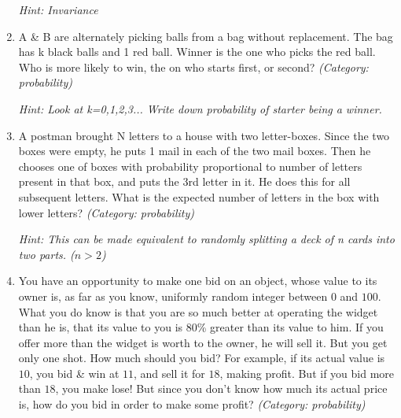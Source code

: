 \begin{enumerate}
\small\emph{Hint: Invariance}





\item A \& B are alternately picking balls from a bag without replacement. The bag has k black balls and 1 red ball. Winner is the one who picks the red ball. Who is more likely to win, the on who starts first, or second?
\small\emph{(Category: probability)}

\small\emph{Hint: Look at k=0,1,2,3... Write down probability of starter being a winner.}





\item A postman brought N letters to a house with two letter-boxes. Since the two boxes were empty, he puts 1 mail in each of the two mail boxes. Then he chooses one of boxes with probability proportional to number of letters present in that box, and puts the 3rd letter in it. He does this for all subsequent letters. What is the expected number of letters in the box with lower letters?
\small\emph{(Category: probability)}

\small\emph{Hint: This can be made equivalent to randomly splitting a deck of n cards into two parts. ($n>2$)}





\item You have an opportunity to make one bid on an object, whose value to its owner is, as far as you know, uniformly random integer between $0$ and $100$. What you do know is that you are so much better at operating the widget than he is, that its value to you is 80\% greater than its value to him. If you offer more than the widget is worth to the owner, he will sell it. But you get only one shot. How much should you bid? For example, if its actual value is $10$, you bid \& win at $11$, and sell it for $18$, making profit. But if you bid more than $18$, you make lose! But since you don't know how much its actual price is, how do you bid in order to make some profit?
\small\emph{(Category: probability)}


\end{enumerate}
